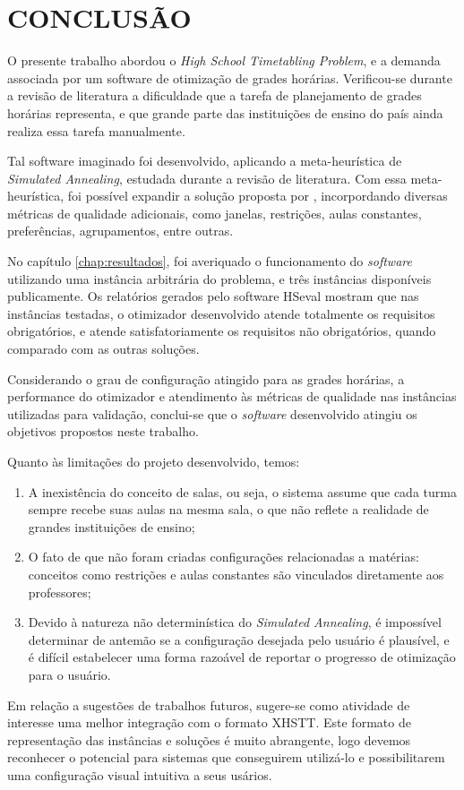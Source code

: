 
\chapter{CONCLUSÃO}
\label{chap:conclusao}

O presente trabalho abordou o \textit{High School Timetabling Problem}, e a demanda associada por um software de otimização de grades horárias. Verificou-se durante a revisão de literatura a dificuldade que a tarefa de planejamento de grades horárias representa, e que grande parte das instituições de ensino do país ainda realiza essa tarefa manualmente.

Tal software imaginado foi desenvolvido, aplicando a meta-heurística de \textit{Simulated Annealing}, estudada durante a revisão de literatura. Com essa meta-heurística, foi possível expandir a solução proposta por , incorpordando diversas métricas de qualidade adicionais, como janelas, restrições, aulas constantes, preferências, agrupamentos, entre outras.

No capítulo \ref{chap:resultados}, foi averiquado o funcionamento do \textit{software} utilizando uma instância arbitrária do problema, e três instâncias disponíveis publicamente. Os relatórios gerados pelo software HSeval mostram que nas instâncias testadas, o otimizador desenvolvido atende totalmente os requisitos obrigatórios, e atende satisfatoriamente os requisitos não obrigatórios, quando comparado com as outras soluções.

Considerando o grau de configuração atingido para as grades horárias, a performance do otimizador e atendimento às métricas de qualidade nas instâncias utilizadas para validação, conclui-se que o \textit{software} desenvolvido atingiu os objetivos propostos neste trabalho.

Quanto às limitações do projeto desenvolvido, temos:
\begin{enumerate}
	\item A inexistência do conceito de salas, ou seja, o sistema assume que cada turma sempre recebe suas aulas na mesma sala, o que não reflete a realidade de grandes instituições de ensino;
	\item O fato de que não foram criadas configurações relacionadas a matérias: conceitos como restrições e aulas constantes são vinculados diretamente aos professores;
	\item Devido à natureza não determinística do \textit{Simulated Annealing}, é impossível determinar de antemão se a configuração desejada pelo usuário é plausível, e é difícil estabelecer uma forma razoável de reportar o progresso de otimização para o usuário.
\end{enumerate}

Em relação a sugestões de trabalhos futuros, sugere-se como atividade de interesse uma melhor integração com o formato XHSTT. Este formato de representação das instâncias e soluções é muito abrangente, logo devemos reconhecer o potencial para sistemas que conseguirem utilizá-lo e possibilitarem uma configuração visual intuitiva a seus usários.
